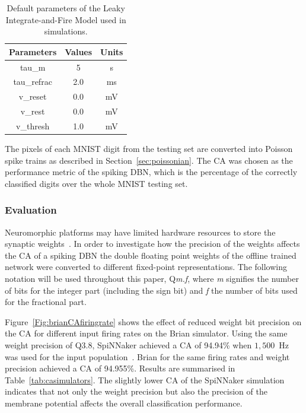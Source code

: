 \documentclass{frontiersENG} %
\begin{document}
\begin{table}[hbbp]
	\centering
	\caption{\label{Tab:NeuralParams}Default parameters of the Leaky Integrate-and-Fire Model used in simulations.}
	\bgroup
	\def\arraystretch{1.1}
	\begin{tabular}{c|c|c}
		Parameters & Values & Units \\
		\hline
		tau\_m & 5 & s\\
		tau\_refrac & 2.0 & ms\\
		v\_reset & 0.0 & mV\\
		v\_rest & 0.0 & mV\\
		v\_thresh & 1.0 & mV\\
	\end{tabular}
	\egroup
\end{table}

The pixels of each MNIST digit from the testing set are converted into Poisson spike trains as described in Section~\ref{sec:poissonian}. %
The CA was chosen as the performance metric of the spiking DBN, which is the percentage of the correctly classified digits over the whole MNIST testing set.

\subsubsection{Evaluation}
Neuromorphic platforms may have limited hardware resources to store the synaptic weights~\citep{schemmel2010wafer,merolla2014million}. In order to investigate how the precision of the weights affects the CA of a spiking DBN the double floating point weights of the offline trained network were converted to different fixed-point representations. The following notation will be used throughout this paper, Q\textit{m.f}, where \textit{m} signifies the number of bits for the integer part (including the sign bit) and \textit{f} the number of bits used for the fractional part.

Figure~\ref{Fig:brianCAfiringrate} shows the effect of reduced weight bit precision on the CA for different input firing rates on the Brian simulator.
Using the same weight precision of Q3.8, SpiNNaker achieved a CA of 94.94\% when $1,500$~Hz was used for the input population~\citep{Stromatias2015scalable}. Brian for the same firing rates and weight precision achieved a CA of 94.955\%. Results are summarised in Table~\ref{tab:casimulators}.
The slightly lower CA of the SpiNNaker simulation indicates that not only the weight precision but also the precision of the membrane potential affects the overall classification performance.    
\end{document}
